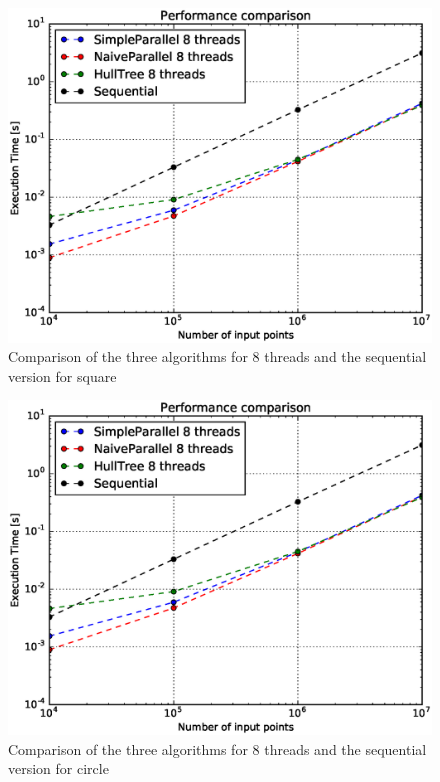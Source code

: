\documentclass[letterpaper]{article}
\begin{document}
\begin{figure}[!ht]\centering
  \includegraphics[scale=0.33]{./plots/SimpleParallel_8&NaiveParallel_8&HullTree_8&Sequential_1.eps}
  \caption{Comparison of the three algorithms for 8 threads and the sequential version for square\label{Input size}}
\end{figure}
\begin{figure}[!ht]\centering
  \includegraphics[scale=0.33]{./plots/SimpleParallel_8&NaiveParallel_8&HullTree_8&Sequential_1.eps}
  \caption{Comparison of the three algorithms for 8 threads and the sequential version for circle\label{Input size}}
\end{figure}
\end{document}

